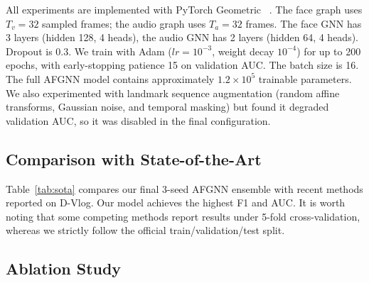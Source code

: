 \documentclass[conference]{IEEEtran}
\begin{document}
All experiments are implemented with PyTorch Geometric~
\cite{fey2019fast}.
The face graph uses $T_v=32$ sampled frames; the audio graph uses $T_a=32$ frames.
The face GNN has 3 layers (hidden 128, 4 heads), the audio GNN has 2 layers (hidden 64, 4 heads).
Dropout is 0.3.
We train with Adam ($lr=10^{-3}$, weight decay $10^{-4}$) for up to 200 epochs, with early-stopping patience 15 on validation AUC.
The batch size is 16.
The full AFGNN model contains approximately $1.2\times10^5$ trainable parameters.
We also experimented with landmark sequence augmentation (random affine transforms, Gaussian noise, and temporal masking) but found it degraded validation AUC, so it was disabled in the final configuration.

\subsection{Comparison with State-of-the-Art}

Table~\ref{tab:sota} compares our final 3-seed AFGNN ensemble with recent methods reported on D-Vlog.
Our model achieves the highest F1 and AUC.
It is worth noting that some competing methods report results under 5-fold cross-validation, whereas we strictly follow the official train/validation/test split.

\begin{table}[t]
\centering
\caption{Comparison with state-of-the-art methods on D-Vlog.}
\label{tab:sota}
\footnotesize
{}
\end{table}

\subsection{Ablation Study}
\end{document}

